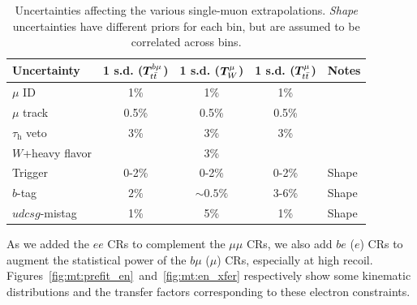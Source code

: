 \begin{table}[]
    \begin{center}
    \caption{Uncertainties affecting the various single-muon extrapolations.
            \emph{Shape} uncertainties have different priors for each bin, but are assumed to be correlated across bins.}
    \label{tab:mt:zmm_uncs}
    \begin{tabular}{lcccl}
        Uncertainty                   & 1 s.d. ($\bm{T}^{b\mu}_{t\bar{t}}$) & 1 s.d. ($\bm{T}^{\mu}_{W}$) & 1 s.d. ($\bm{T}^{\mu}_{t\bar{t}}$)  & Notes \\
        \hline \hline
        $\mu$ ID                      & 1\%                         & 1\%                   & 1\%                         & \\
        $\mu$ track                   & 0.5\%                       & 0.5\%                 & 0.5\%                       & \\
        $\tau_\mathrm{h}$ veto        & 3\%                         & 3\%                   &  3\%                        & \\
        $W$+heavy flavor              &                             & 3\%                   &                             & \\
        Trigger                       & 0-2\%                       & 0-2\%                 &  0-2\%                      & Shape \\
        $b$-tag                       & $2\%$                       & $\sim0.5\%$           &  3-6\%                      & Shape \\
        $udcsg$-mistag                & 1\%                         & 5\%                   & 1\%                         & Shape \\
    \end{tabular}
\end{center}
\end{table}

As we added the $ee$ CRs to complement the $\mu\mu$ CRs, we also add $be$ ($e$) CRs to augment the statistical power of the $b\mu$ ($\mu$) CRs, especially at high recoil.
Figures~\ref{fig:mt:prefit_en}~and~\ref{fig:mt:en_xfer} respectively show some kinematic distributions and the transfer factors corresponding to these electron constraints.

